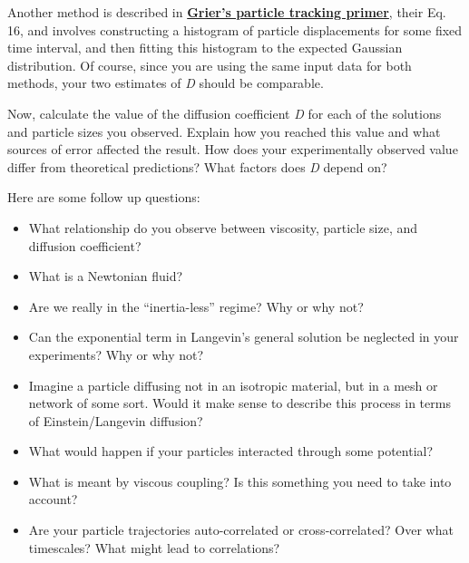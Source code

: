 \documentclass{../lab}
\begin{document}
Another method is described in \href{http://www.physics.nyu.edu/grierlab/methods/node11.html#eqes}{\textbf{Grier's particle tracking primer}}, their Eq. 16, and involves constructing a histogram of particle displacements for some fixed time interval, and then fitting this histogram to the expected Gaussian distribution. Of course, since you are using the same input data for both methods, your two estimates of \emph{D} should be comparable.

Now, calculate the value of the diffusion coefficient \emph{D} for each of the solutions and particle sizes you observed. Explain how you reached this value and what sources of error affected the result. How does your experimentally observed value differ from theoretical predictions? What factors does \emph{D} depend on?

Here are some follow up questions:

\begin{itemize}
    \item What relationship do you observe between viscosity, particle size, and diffusion coefficient?

    \item What is a Newtonian fluid?

    \item Are we really in the ``inertia-less'' regime? Why or why not?

    \item Can the exponential term in Langevin's general solution be neglected in your experiments? Why or why not?

    \item Imagine a particle diffusing not in an isotropic material, but in a mesh or network of some sort. Would it make sense to describe this process in terms of Einstein/Langevin diffusion?

    \item What would happen if your particles interacted through some potential?

    \item What is meant by viscous coupling? Is this something you need to take into account?

    \item Are your particle trajectories auto-correlated or cross-correlated? Over what timescales? What might lead to correlations?
\end{itemize}

\end{document}

